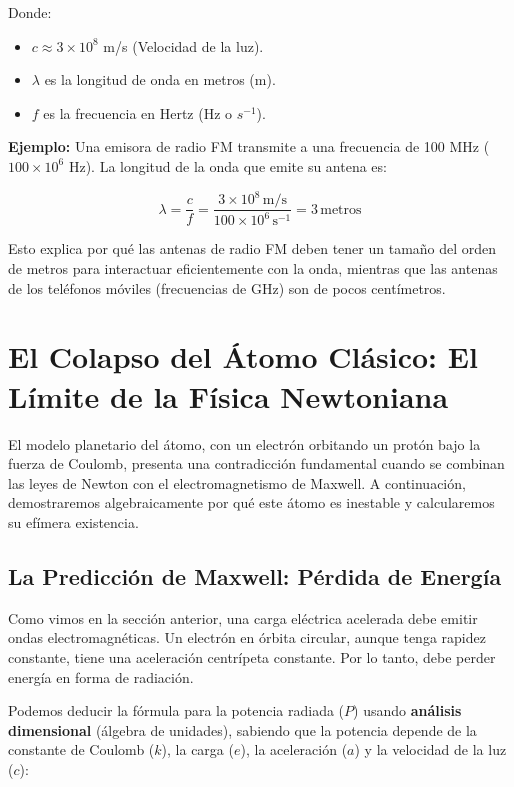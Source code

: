 \documentclass[11pt,a4paper]{book}
\begin{document}
Donde:
\begin{itemize}
    \item $c \approx 3 \times 10^8$ m/s (Velocidad de la luz).
    \item $\lambda$ es la longitud de onda en metros (m).
    \item $f$ es la frecuencia en Hertz (Hz o $s^{-1}$).
\end{itemize}

\textbf{Ejemplo:} Una emisora de radio FM transmite a una frecuencia de 100 MHz ($100 \times 10^6$ Hz). La longitud de la onda que emite su antena es:

\begin{equation}
    \lambda = \frac{c}{f} = \frac{3 \times 10^8 \, \text{m/s}}{100 \times 10^6 \, \text{s}^{-1}} = 3 \, \text{metros}
\end{equation}

Esto explica por qué las antenas de radio FM deben tener un tamaño del orden de metros para interactuar eficientemente con la onda, mientras que las antenas de los teléfonos móviles (frecuencias de GHz) son de pocos centímetros.

\section{El Colapso del Átomo Clásico: El Límite de la Física Newtoniana}

El modelo planetario del átomo, con un electrón orbitando un protón bajo la fuerza de Coulomb, presenta una contradicción fundamental cuando se combinan las leyes de Newton con el electromagnetismo de Maxwell. A continuación, demostraremos algebraicamente por qué este átomo es inestable y calcularemos su efímera existencia.

\subsection{La Predicción de Maxwell: Pérdida de Energía}

Como vimos en la sección anterior, una carga eléctrica acelerada debe emitir ondas electromagnéticas. Un electrón en órbita circular, aunque tenga rapidez constante, tiene una aceleración centrípeta constante. Por lo tanto, debe perder energía en forma de radiación.

Podemos deducir la fórmula para la potencia radiada ($P$) usando \textbf{análisis dimensional} (álgebra de unidades), sabiendo que la potencia depende de la constante de Coulomb ($k$), la carga ($e$), la aceleración ($a$) y la velocidad de la luz ($c$):
\end{document}
